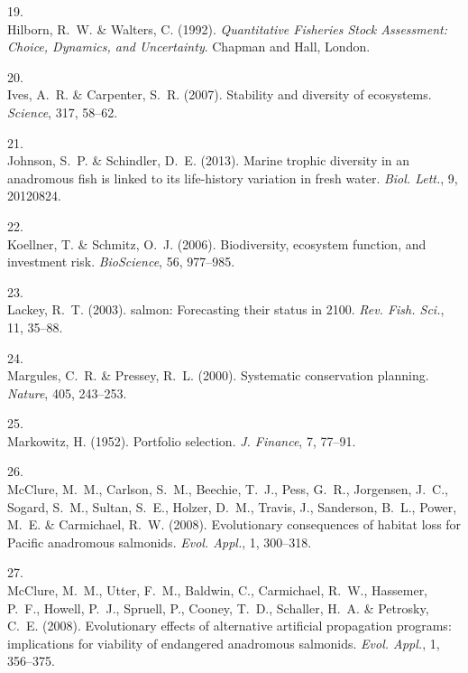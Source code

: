 \documentclass[11pt]{article}
\begin{document}
\begin{spacing}{1.6}
\begin{thebibliography}{50}
19.\\
Hilborn, R.~W. \& Walters, C. (1992).
\newblock \emph{Quantitative Fisheries Stock Assessment: Choice, Dynamics, and
  Uncertainty}.
\newblock Chapman and Hall, London.

20.\\
Ives, A.~R. \& Carpenter, S.~R. (2007).
\newblock Stability and diversity of ecosystems.
\newblock \emph{Science}, 317, 58--62.

21.\\
Johnson, S.~P. \& Schindler, D.~E. (2013).
\newblock Marine trophic diversity in an anadromous fish is linked to its
  life-history variation in fresh water.
\newblock \emph{Biol. Lett.}, 9, 20120824.

22.\\
Koellner, T. \& Schmitz, O.~J. (2006).
\newblock Biodiversity, ecosystem function, and investment risk.
\newblock \emph{BioScience}, 56, 977--985.

23.\\
Lackey, R.~T. (2003).
 salmon: Forecasting their status in 2100.
\newblock \emph{Rev. Fish. Sci.}, 11, 35--88.

24.\\
Margules, C.~R. \& Pressey, R.~L. (2000).
\newblock Systematic conservation planning.
\newblock \emph{Nature}, 405, 243--253.

25.\\
Markowitz, H. (1952).
\newblock Portfolio selection.
\newblock \emph{J. Finance}, 7, 77--91.

26.\\
McClure, M.~M., Carlson, S.~M., Beechie, T.~J., Pess, G.~R., Jorgensen, J.~C.,
  Sogard, S.~M., Sultan, S.~E., Holzer, D.~M., Travis, J., Sanderson, B.~L.,
  Power, M.~E. \& Carmichael, R.~W. (2008{}).
\newblock Evolutionary consequences of habitat loss for {Pacific} anadromous
  salmonids.
\newblock \emph{Evol. Appl.}, 1, 300--318.

27.\\
McClure, M.~M., Utter, F.~M., Baldwin, C., Carmichael, R.~W., Hassemer, P.~F.,
  Howell, P.~J., Spruell, P., Cooney, T.~D., Schaller, H.~A. \& Petrosky, C.~E.
  (2008{}).
\newblock Evolutionary effects of alternative artificial propagation programs:
  implications for viability of endangered anadromous salmonids.
\newblock \emph{Evol. Appl.}, 1, 356--375.


\end{thebibliography}
\end{spacing}
\end{document}
